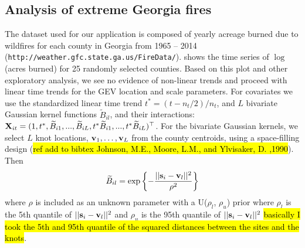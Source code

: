 \documentclass[11pt]{article}
\begin{document}
\subsection{Analysis of extreme Georgia fires}\label{ebs:georgia}
The dataset used for our application is composed of yearly acreage burned due to wildfires for each county in Georgia from 1965 -- 2014 (\texttt{http://weather.gfc.state.ga.us/FireData/}).
 shows the time series of $\log$(acres burned) for 25 randomly selected counties.
Based on this plot and other exploratory analysis, we see no evidence of non-linear trends and proceed with linear time trends for the GEV location and scale parameters.
For covariates we use the standardized linear time trend $t^* = (t-n_t/2)/n_t$, and $L$ bivariate Gaussian kernel functions $\widetilde{B}_{il}$, and their interactions: $\mbox{\bf X}_{it} = (1,t^*,\widetilde{B}_{i1},...,\widetilde{B}_{iL},t^*\widetilde{B}_{i1},...,t^*\widetilde{B}_{iL})^\top$.
For the bivariate Gaussian kernels, we select $L$ knot locations, $\mbox{\bf v}_{1}, \ldots, \mbox{\bf v}_{L}$ from the county centroids, using a space-filling design (\hl{ref add to bibtex Johnson, M.E., Moore, L.M., and Ylvisaker, D. ,1990}).
Then
\begin{align}\label{ebeq:bivGausskern}
  \widetilde{B}_{il} = \exp\left\{-\frac{||\mbox{\bf s}_i - \mbox{\bf v}_l||^2}{\rho^2}\right\}
\end{align}
where $\rho$ is included as an unknown parameter with a U($\rho_l$, $\rho_u$) prior where $\rho_l$ is the 5th quantile of $||\mbox{\bf s}_i - \mbox{\bf v}_l||^2$ and $\rho_u$ is the 95th quantile of $||\mbox{\bf s}_i - \mbox{\bf v}_l||^2$ \hl{basically I took the 5th and 95th quantile of the squared distances between the sites and the knots}.


\vspace{2em} %
\end{document}
